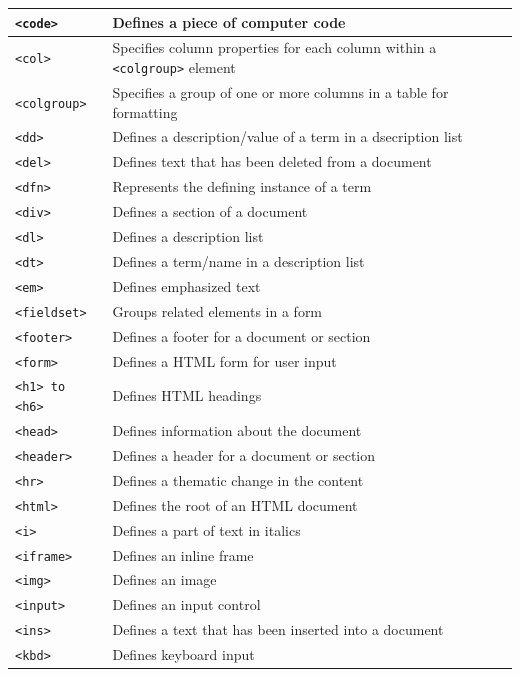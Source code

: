 \documentclass[11pt, letterpaper]{article}
\begin{document}
\begin{longtable}{l l}
			\texttt{<code>} & Defines a piece of computer code\\\midrule
			\texttt{<col>} & Specifies column properties for each column within a \texttt{<colgroup>} element\\\midrule
			\texttt{<colgroup>} & Specifies a group of one or more columns in a table for formatting\\\midrule
			\texttt{<dd>} & Defines a description/value of a term in a dsecription list\\\midrule
			\texttt{<del>} & Defines text that has been deleted from a document\\\midrule
			\texttt{<dfn>} & Represents the defining instance of a term \\\midrule
			\texttt{<div>} & Defines a section of a document\\\midrule
			\texttt{<dl>} & Defines a description list\\\midrule
			\texttt{<dt>} & Defines a term/name in a description list\\\midrule
			\texttt{<em>} & Defines emphasized text \\\midrule
			\texttt{<fieldset>} & Groups related elements in a form\\\midrule
			\texttt{<footer>} & Defines a footer for a document or section\\\midrule
			\texttt{<form>} & Defines a HTML form for user input\\\midrule
			\texttt{<h1> to <h6>} & Defines HTML headings\\\midrule
			\texttt{<head>} & Defines information about the document\\\midrule
			\texttt{<header>} & Defines a header for a document or section\\\midrule
			\texttt{<hr>} & Defines a thematic change in the content\\\midrule
			\texttt{<html>} & Defines the root of an HTML document\\\midrule
			\texttt{<i>} & Defines a part of text in italics\\\midrule
			\texttt{<iframe>} & Defines an inline frame\\\midrule
			\texttt{<img>} & Defines an image\\\midrule
			\texttt{<input>} & Defines an input control\\\midrule
			\texttt{<ins>} & Defines a text that has been inserted into a document\\\midrule
			\texttt{<kbd>} & Defines keyboard input\\\midrule

\end{longtable}
\end{document}
